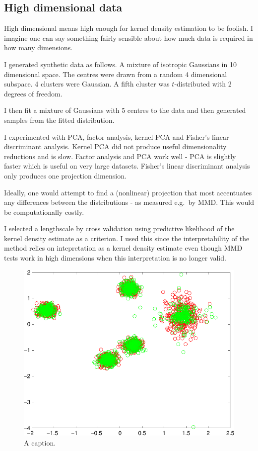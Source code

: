 \documentclass{article}
\def\eg{e.g.\ }
\begin{document}
\subsection{High dimensional data}


High dimensional means high enough for kernel density estimation to be foolish.
I imagine one can say something fairly sensible about how much data is required in how many dimensions.

I generated synthetic data as follows.
A mixture of isotropic Gaussians in 10 dimensional space.
The centres were drawn from a random 4 dimensional subspace.
4 clusters were Gaussian.
A fifth cluster was $t$-distributed with 2 degrees of freedom.

I then fit a mixture of Gaussians with 5 centres to the data and then generated samples from the fitted distribution.

I experimented with PCA, factor analysis, kernel PCA and Fisher's linear discriminant analysis.
Kernel PCA did not produce useful dimensionality reductions and is slow.
Factor analysis and PCA work well - PCA is slightly faster which is useful on very large datasets.
Fisher's linear discriminant analysis only produces one projection dimension.

Ideally, one would attempt to find a (nonlinear) projection that most accentuates any differences between the distributions - as measured \eg by MMD.
This would be computationally costly.

I selected a lengthscale by cross validation using predictive likelihood of the kernel density estimate as a criterion.
I used this since the interpretability of the method relies on intepretation as a kernel density estimate even though MMD tests work in high dimensions when this interpretation is no longer valid.

\begin{figure}[ht]
\centering
\includegraphics[width=0.98\columnwidth]{figures/high_mog_fa}
\caption{
A caption.
}
\label{fig:high_mog_fa}
\end{figure}
\end{document}
